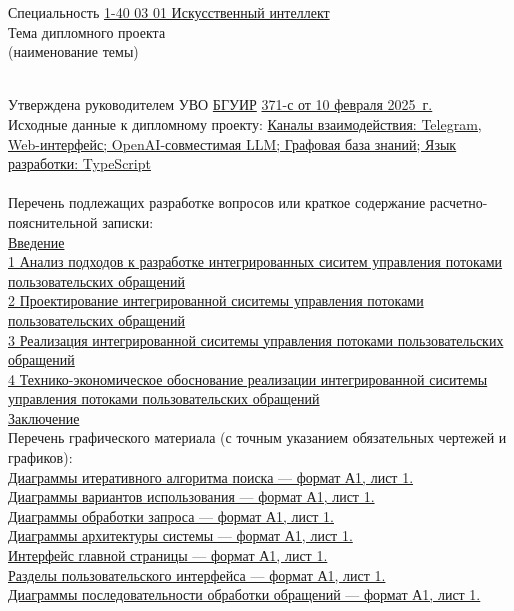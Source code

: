 {\begin{center}
  Специальность \uline{1-40 03 01 Искусственный интеллект}\lineunderscore\\[0.5em]

  Тема дипломного проекта \uline{\topicName}\lineunderscore \\
  {\footnotesize\hspace{15em}(наименование темы)}\\[-0.5em]
  \lineunderscore\\[0.5em]
  \end{center}

  Утверждена руководителем УВО \uline{БГУИР} \textnumero  \uline{371-с от 10 февраля 2025~г.}\lineunderscore\\[-0.5em]
  
  Исходные данные к дипломному проекту: \uline{Каналы взаимодействия: Telegram, Web-интерфейс; OpenAI-совместимая LLM; Графовая база знаний; Язык разработки: TypeScript}\lineunderscore\\[0.5em]
  \lineunderscore\\
  
  Перечень подлежащих разработке вопросов или краткое содержание расчетно-пояснительной записки: 
  \lineunderscore\\
  \uline{Введение}\lineunderscore\\
  \uline{1 Анализ подходов к разработке интегрированных сиситем управления потоками пользовательских обращений}\lineunderscore\\
  \uline{2 Проектирование интегрированной сиситемы управления потоками пользовательских обращений}\lineunderscore\\
  \uline{3 Реализация интегрированной сиситемы управления потоками пользовательских обращений}\lineunderscore\\
  \uline{4 Технико-экономическое обоснование реализации интегрированной сиситемы управления потоками пользовательских обращений}\lineunderscore\\
  \uline{Заключение}\lineunderscore\\

  Перечень графического материала (с точным указанием обязательных чертежей и графиков):
  \lineunderscore\\
  \uline{Диаграммы итеративного алгоритма поиска --- формат А1, лист 1. }\lineunderscore\\
  \uline{Диаграммы вариантов использования --- формат А1, лист 1. }\lineunderscore\\
  \uline{Диаграммы обработки запроса --- формат А1, лист 1. }\lineunderscore\\
  \uline{Диаграммы архитектуры системы --- формат А1, лист 1. }\lineunderscore\\
  \uline{Интерфейс главной страницы --- формат А1, лист 1. }\lineunderscore\\
  \uline{Разделы пользовательского интерфейса --- формат А1, лист 1. }\lineunderscore\\
  \uline{Диаграммы последовательности обработки обращений --- формат А1, лист 1. }\lineunderscore\\
  \lineunderscore\\

}
